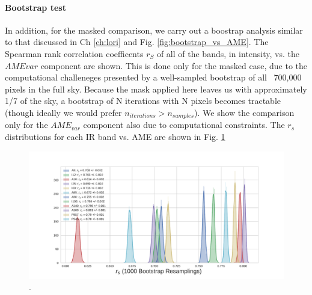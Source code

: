         \paragraph{Bootstrap test}
            In addition, for the masked comparison, we carry out a boostrap analysis similar to that discussed in Ch \ref{ch:lori} and Fig. \ref{fig:bootstrap_vs_AME}. The Spearman rank correlation coefficents $r_{S}$ of all of the bands, in intensity, vs. the $AME{var}$ component are shown. This is done only for the masked case, due to the computational challeneges presented by a well-sampled bootstrap of all ~700,000 pixels in the full sky. Because the mask applied here leaves us with approximately 1/7 of the sky, a bootstrap of N iterations with N pixels becomes tractable (though ideally we would prefer $n_{iterations} > n_{samples}$). We show the comparison only for the $AME_{var}$ component also due to computational constraints. The $r_{s}$ distributions for each IR band vs. AME are shown in Fig. \ref{fig:bootstrap_vs_AME_allsky_masked}
            \begin{figure}
                 \includegraphics[width=\textwidth]{../Plots/ch_allsky/bootstrap_vs_AME_spearman_maskall_i1000.pdf}
                 \centering
                 \caption{.}
                 \label{fig:bootstrap_vs_AME_allsky_masked}
            \end{figure}

